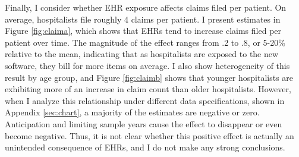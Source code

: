 \documentclass[12pt]{article}
\begin{document}
Finally, I consider whether EHR exposure affects claims filed per patient. On average, hospitalists file roughly 4 claims per patient. I present estimates in Figure \ref{fig:claima}, which shows that EHRs tend to increase claims filed per patient over time. The magnitude of the effect ranges from .2 to .8, or 5-20\% relative to the mean, indicating that as hospitalists are exposed to the new software, they bill for more items on average.  I also show heterogeneity of this result by age group, and Figure \ref{fig:claimb} shows that younger hospitalists are exhibiting more of an increase in claim count than older hospitalists. However, when I analyze this relationship under different data specifications, shown in Appendix \ref{sec:chart}, a majority of the estimates are negative or zero. Anticipation and limiting sample years cause the effect to disappear or even become negative. Thus, it is not clear whether this positive effect is actually an unintended consequence of EHRs, and I do not make any strong conclusions. 
\end{document}
